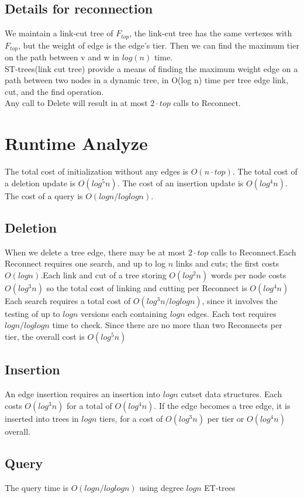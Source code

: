 \documentclass[conference,compsoc]{IEEEtran}
\begin{document}
\subsection{Details for reconnection}
We maintain a link-cut tree of $F_{top}$, the link-cut tree has the same vertexes with $F_{top}$, but the weight of edge is the edge's tier.
Then we can find the maximum tier on the path between v and w in $log(n)$ time.\\
ST-trees(link cut tree) provide a means of finding the maximum weight edge on a path between two nodes in a dynamic tree, in O(log n) time per tree edge link, cut, and the find operation.\\
Any call to Delete will result in at most $2 · top$ calls to Reconnect.
\section{Runtime Analyze}
The total cost of initialization without any edges is $O(n· top)$. The total cost of a deletion update is $O(log^5 n)$. The cost of an insertion update is $O(log^4 n)$. The cost of a query is $O(log n/ log log n)$.\\
\subsection{Deletion}
When we delete a tree edge, there may be at most $2 · top$ calls to Reconnect.Each Reconnect requires one search, and up to log $n$ links and cuts; the first costs $O(log n)$.Each link and cut of a tree storing $O(log^2 n)$ words per node costs $O(log^3 n)$ so the total cost of linking and cutting per Reconnect is $O(log^4 n)$\\
Each search requires a total cost of $O(log^3 n/ log log n)$, since it involves the testing of up to $log n$ versions each containing
$log n$ edges. Each test requires $log n/ log log n$ time to check. Since there are no more than two Reconnects per tier, the overall cost is $O(log^5 n)$
\subsection{Insertion}
An edge insertion requires an insertion into $log n$ cutset
data structures. Each costs $O(log^3 n)$ for a total of
$O(log^4 n)$. If the edge becomes a tree edge, it is inserted
into trees in $log n$ tiers, for a cost of $O(log^3 n)$ per tier
or $O(log^4 n)$ overall.
\subsection{Query}
The query time is $O(log n/ log log n)$ using degree $log n$ ET-trees
\end{document}
